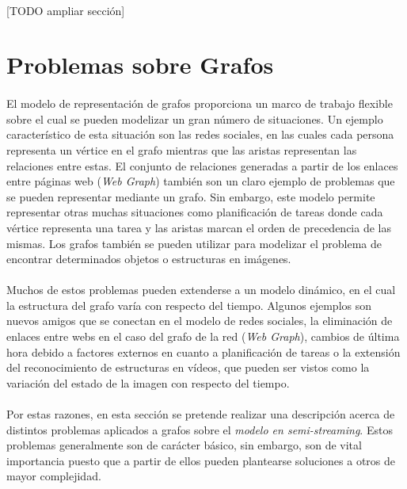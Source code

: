 \documentclass{subfiles}
\begin{document}
        \paragraph{}
        [TODO ampliar sección]


    \section{Problemas sobre Grafos}
    \label{sec:graph_problems}

      \paragraph{}
      El modelo de representación de grafos proporciona un marco de trabajo flexible sobre el cual se pueden modelizar un gran número de situaciones. Un ejemplo característico de esta situación son las redes sociales, en las cuales cada persona representa un vértice en el grafo mientras que las aristas representan las relaciones entre estas. El conjunto de relaciones generadas a partir de los enlaces entre páginas web (\emph{Web Graph}) también son un claro ejemplo de problemas que se pueden representar mediante un grafo. Sin embargo, este modelo permite representar otras muchas situaciones como planificación de tareas donde cada vértice representa una tarea y las aristas marcan el orden de precedencia de las mismas. Los grafos también se pueden utilizar para modelizar el problema de encontrar determinados objetos o estructuras en imágenes.

      \paragraph{}
      Muchos de estos problemas pueden extenderse a un modelo dinámico, en el cual la estructura del grafo varía con respecto del tiempo. Algunos ejemplos son nuevos amigos que se conectan en el modelo de redes sociales, la eliminación de enlaces entre webs en el caso del grafo de la red (\emph{Web Graph}), cambios de última hora debido a factores externos en cuanto a planificación de tareas o la extensión del reconocimiento de estructuras en vídeos, que pueden ser vistos como la variación del estado de la imagen con respecto del tiempo.

      \paragraph{}
      Por estas razones, en esta sección se pretende realizar una descripción acerca de distintos problemas aplicados a grafos sobre el \emph{modelo en semi-streaming}. Estos problemas generalmente son de carácter básico, sin embargo, son de vital importancia puesto que a partir de ellos pueden plantearse soluciones a otros de mayor complejidad.
\end{document}
